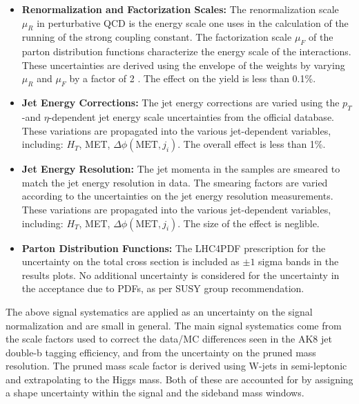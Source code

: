 \begin{itemize}
\item {\bf Renormalization and Factorization Scales:}
The renormalization scale $\mu_{R}$ in perturbative QCD is the energy scale one uses in the calculation of the running of the strong coupling constant. The factorization scale $\mu_{F}$ of the parton distribution functions characterize the energy scale of the interactions. These uncertainties are derived using the envelope of the weights by varying $\mu_{R}$ and $\mu_{F}$ by a factor of 2 \cite{Cacciari:2003fi, Catani:2003zt}. The effect on the yield is less than 0.1\%.

\item {\bf Jet Energy Corrections:}
The jet energy corrections are varied using the $p_{T}$-and $\eta$-dependent jet energy scale uncertainties from the official database. These variations are propagated into the various jet-dependent variables, including: $H_{T}$, MET, $\Delta\phi(\textrm{MET},j_{i})$. The overall effect is less than 1\%.

\item {\bf Jet Energy Resolution:}
The jet momenta in the  samples are smeared to match the jet energy resolution in data. The smearing factors are varied according to the uncertainties on the jet energy resolution measurements. These variations are propagated into the various jet-dependent variables, including: $H_{T}$, MET, $\Delta\phi(\textrm{MET},j_{i})$.
The size of the effect is neglible.

\item {\bf Parton Distribution Functions:}
The LHC4PDF prescription for the uncertainty on the total cross section is included as $\pm 1$ sigma bands in the results plots. No additional uncertainty is considered for the uncertainty in the acceptance due to PDFs, as per SUSY group recommendation.

\end{itemize}

The above signal systematics are applied as an uncertainty on the signal normalization and are small in general. The main signal systematics 
come from the scale factors used to correct the data/MC differences seen in the AK8 jet double-b tagging efficiency, and from the uncertainty on the pruned mass resolution. The pruned mass scale factor is derived using W-jets in semi-leptonic \ttbar and extrapolating to the Higgs mass. Both of these are accounted for by assigning a shape uncertainty within the signal and the sideband mass windows.

